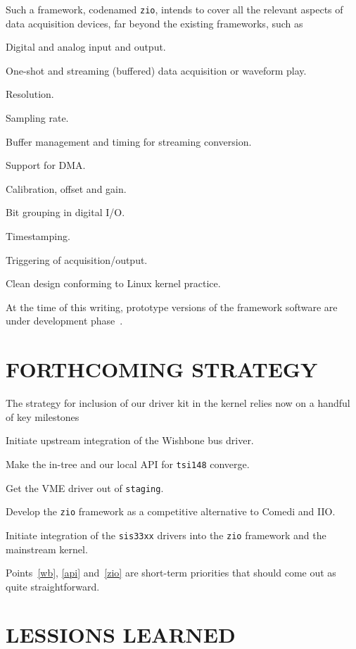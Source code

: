 \documentclass{JAC2003}
\begin{document}
Such a framework, codenamed \texttt{zio}, intends to cover all the relevant
aspects of data acquisition devices, far beyond the existing frameworks,
such as
\begin{Itemize}
\item Digital and analog input and output.
\item One-shot and streaming (buffered) data acquisition or waveform play.
\item Resolution.
\item Sampling rate.
\item Buffer management and timing for streaming conversion.
\item Support for DMA.
\item Calibration, offset and gain.
\item Bit grouping in digital I/O.
\item Timestamping.
\item Triggering of acquisition/output.
\item Clean design conforming to Linux kernel practice.
\end{Itemize}
At the time of this writing, prototype versions of the framework software
are under development phase~\cite{zio-git}.

\section{FORTHCOMING STRATEGY}

The strategy for inclusion of our driver kit in the kernel relies now on a
handful of key milestones
\begin{Enumerate}
\item Initiate upstream integration of the Wishbone bus driver.
	\label{wb}
\item Make the in-tree and our local API for \verb|tsi148| converge.
	\label{api}
\item Get the VME driver out of \texttt{staging}.
\item Develop the \texttt{zio} framework as a competitive alternative
	to Comedi and IIO.
	\label{zio}
\item Initiate integration of the \texttt{sis33xx} drivers into the
    \texttt{zio} framework and the mainstream kernel.
\end{Enumerate}
Points~\ref{wb}, \ref{api} and~\ref{zio} are short-term priorities that
should come out as quite straightforward.

\section{LESSIONS LEARNED}
\end{document}

